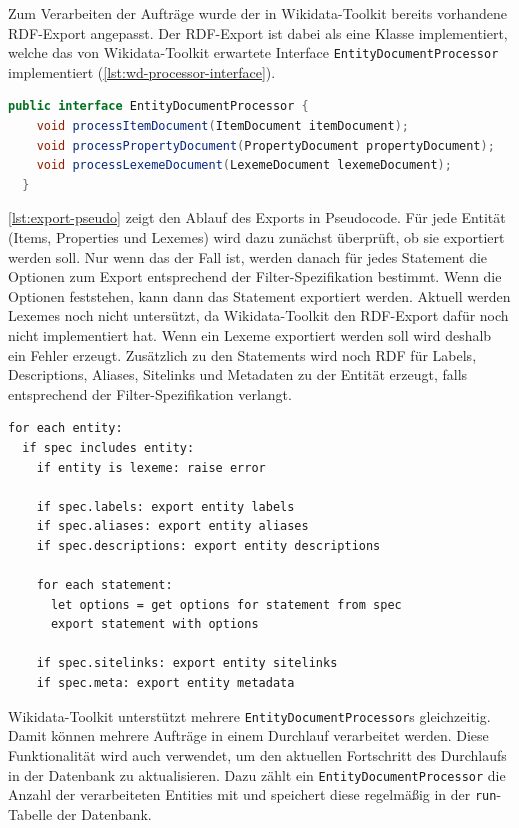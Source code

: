 Zum Verarbeiten der Aufträge wurde der in Wikidata-Toolkit bereits vorhandene RDF-Export angepasst.
Der RDF-Export ist dabei als eine Klasse implementiert, welche das von Wikidata-Toolkit erwartete Interface \verb|EntityDocumentProcessor| implementiert (\cref{lst:wd-processor-interface}).

\begin{lstlisting}[language=Java, caption={EntityDocumentProcessor Interface}, label={lst:wd-processor-interface}]
  public interface EntityDocumentProcessor {
    void processItemDocument(ItemDocument itemDocument);
    void processPropertyDocument(PropertyDocument propertyDocument);
    void processLexemeDocument(LexemeDocument lexemeDocument);
  }
\end{lstlisting}


\cref{lst:export-pseudo} zeigt den Ablauf des Exports in Pseudocode.
Für jede Entität (Items, Properties und Lexemes) wird dazu zunächst überprüft, ob sie exportiert werden soll.
Nur wenn das der Fall ist, werden danach für jedes Statement die Optionen zum Export entsprechend der Filter-Spezifikation bestimmt. 
Wenn die Optionen feststehen, kann dann das Statement exportiert werden.
Aktuell werden Lexemes noch nicht untersützt, da Wikidata-Toolkit den RDF-Export dafür noch nicht implementiert hat.
Wenn ein Lexeme exportiert werden soll wird deshalb ein Fehler erzeugt.
Zusätzlich zu den Statements wird noch RDF für Labels, Descriptions, Aliases, Sitelinks und Metadaten zu der Entität erzeugt, falls entsprechend der Filter-Spezifikation verlangt.

\begin{lstlisting}[keywords={for,each,if,let}, caption={Export Pseudocode}, label={lst:export-pseudo}]
for each entity:
  if spec includes entity:
    if entity is lexeme: raise error
  
    if spec.labels: export entity labels
    if spec.aliases: export entity aliases
    if spec.descriptions: export entity descriptions

    for each statement:
      let options = get options for statement from spec
      export statement with options

    if spec.sitelinks: export entity sitelinks
    if spec.meta: export entity metadata
\end{lstlisting}

Wikidata-Toolkit unterstützt mehrere \verb|EntityDocumentProcessor|s gleichzeitig.
Damit können mehrere Aufträge in einem Durchlauf verarbeitet werden. 
Diese Funktionalität wird auch verwendet, um den aktuellen Fortschritt des Durchlaufs in der Datenbank zu aktualisieren.
Dazu zählt ein \verb|EntityDocumentProcessor| die Anzahl der verarbeiteten Entities mit und speichert diese regelmäßig in der \verb|run|-Tabelle der Datenbank.

